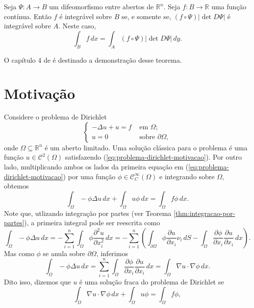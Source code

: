 \documentclass[a4paper, 11pt]{book}
\theoremstyle{definition}
\newcommand{\bR}{\mathbb{R}}
\newcommand{\cC}{\mathcal{C}}
\begin{document}
\begin{tbox} \label{thm:mudanca-de-variaveis}
    Seja $\Psi : A \to B$ um difeomorfismo entre abertos de $\bR^n$. Seja $f : B \to \bR$ uma função contínua. Então $f$ é integrável sobre $B$ se, e somente se, $(f \circ \Psi) |\det D\Psi|$ é integrável sobre $A$. Neste caso,
    \[
        \int_B f \,dx = \int_A (f \circ \Psi) |\det D\Psi| \,dy.
    \]
\end{tbox}
\begin{prf}
    O capítulo 4 de \cite{munkres-analysis.on.manifolds} é destinado a demonstração desse teorema.
\end{prf}

\section{Motivação}
Considere o problema de Dirichlet
\begin{equation} \label{eq:problema-dirichlet-motivacao}
    \left\{  
        \begin{aligned}
            -\Delta u + u = f &\text{ em } \Omega;\\
            u = 0 &\text{ sobre } \partial\Omega,
        \end{aligned}
    \right.
\end{equation}
onde $\Omega \subseteq \bR^n$ é um aberto limitado.
Uma solução clássica para o problema é uma função $u \in \cC^2(\Omega)$ satisfazendo (\ref{eq:problema-dirichlet-motivacao}). 
Por outro lado, multiplicando ambos os lados da primeira equação em (\ref{eq:problema-dirichlet-motivacao}) por uma função $\phi \in \cC^{\infty}_C(\Omega)$ e integrando sobre $\Omega$, obtemos
\[
    \int_\Omega - \phi \Delta u \,dx + \int_\Omega u \phi \,dx = \int_\Omega f \phi \,dx.
\]
Note que, utlizando integração por partes (ver Teorema \ref{thm:integracao-por-partes}), a primeira integral pode ser reescrita como
\[
    \int_\Omega -\phi \Delta u \,dx = -\sum_{i=1}^n \int_\Omega \phi \frac{\partial^2 u}{\partial x_i^2} \,dx = -\sum_{i=1}^n \left( \int_{\partial\Omega} \phi \frac{\partial u}{\partial x_i} \nu_i \,dS - \int_\Omega \frac{\partial \phi}{\partial x_i} \frac{\partial u}{\partial x_i} \,dx\right).
\]
Mas como $\phi$ se anula sobre $\partial \Omega$, inferimos
\[
    \int_\Omega -\phi \Delta u \,dx = \sum_{i=1}^n \int_\Omega \frac{\partial \phi}{\partial x_i} \frac{\partial u}{\partial x_i} \,dx = \int_{\Omega} \nabla u \cdot \nabla \phi \,dx.
\]
Dito isso, dizemos que $u$ é uma solução fraca do problema de Dirichlet se
\begin{equation} \label{eq:sol-fraca-dirichlet}
    \int_{\Omega} \nabla u \cdot \nabla \phi \,dx + \int_\Omega u\phi = \int_\Omega f \phi,
\end{equation}
\end{document}
